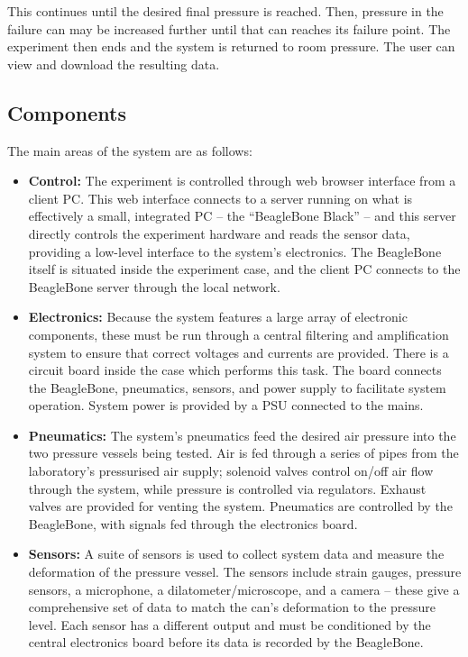 This continues until the desired final pressure is reached. Then, pressure in the failure can may be increased further until that can reaches its failure point. The experiment then ends and the system is returned to room pressure. The user can view and download the resulting data.

\subsection{Components}

The main areas of the system are as follows:

\begin{itemize}
	\item {\bf Control:} The experiment is controlled through web browser interface from a client PC. This web interface connects to a server running on what is effectively a small, integrated PC – the ``BeagleBone Black'' – and this server directly controls the experiment hardware and reads the sensor data, providing a low-level interface to the system’s electronics. The BeagleBone itself is situated inside the experiment case, and the client PC connects to the BeagleBone server through the local network.
	\item {\bf Electronics:} Because the system features a large array of electronic components, these must be run through a central filtering and amplification system to ensure that correct voltages and currents are provided. There is a circuit board inside the case which performs this task. The board connects the BeagleBone, pneumatics, sensors, and power supply to facilitate system operation. System power is provided by a PSU connected to the mains.
	\item {\bf Pneumatics:} The system’s pneumatics feed the desired air pressure into the two pressure vessels being tested. Air is fed through a series of pipes from the laboratory’s pressurised air supply; solenoid valves control on/off air flow through the system, while pressure is controlled via regulators. Exhaust valves are provided for venting the system. Pneumatics are controlled by the BeagleBone, with signals fed through the electronics board.
	\item {\bf Sensors:} A suite of sensors is used to collect system data and measure the deformation of the pressure vessel. The sensors include strain gauges, pressure sensors, a microphone, a dilatometer/microscope, and a camera – these give a comprehensive set of data to match the can’s deformation to the pressure level. Each sensor has a different output and must be conditioned by the central electronics board before its data is recorded by the BeagleBone.


\end{itemize}
